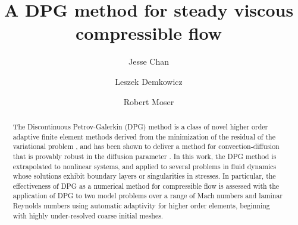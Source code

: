\documentclass{elsarticle}
\date{}
\begin{document}
\begin{frontmatter}

\author{Jesse Chan}
\author{Leszek Demkowicz}
\author{Robert Moser}

\title{A DPG method for steady viscous compressible flow}

\begin{abstract}
The Discontinuous Petrov-Galerkin (DPG) method is a class of novel higher order adaptive finite element methods derived from the minimization of the residual of the variational problem \cite{DPG2}, and has been shown to deliver a method for convection-diffusion that is provably robust in the diffusion parameter \cite{DPGrobustness,DPGrobustness2}.  In this work, the DPG method is extrapolated to nonlinear systems, and applied to several problems in fluid dynamics whose solutions exhibit boundary layers or singularities in stresses.  In particular, the effectiveness of DPG as a numerical method for compressible flow is assessed with the application of DPG to two model problems over a range of Mach numbers and laminar Reynolds numbers using automatic adaptivity for higher order elements, beginning with highly under-resolved coarse initial meshes.  
\end{abstract}

\end{frontmatter}














%


\end{document}

